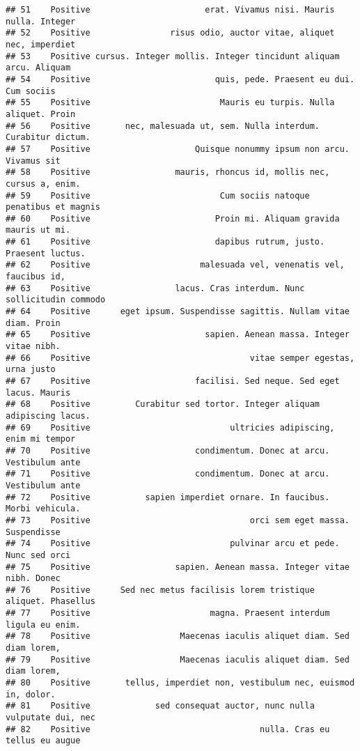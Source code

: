 \documentclass[
]{article}
\begin{document}
\begin{verbatim}
## 51    Positive                       erat. Vivamus nisi. Mauris nulla. Integer
## 52    Positive                risus odio, auctor vitae, aliquet nec, imperdiet
## 53    Positive cursus. Integer mollis. Integer tincidunt aliquam arcu. Aliquam
## 54    Positive                         quis, pede. Praesent eu dui. Cum sociis
## 55    Positive                          Mauris eu turpis. Nulla aliquet. Proin
## 56    Positive       nec, malesuada ut, sem. Nulla interdum. Curabitur dictum.
## 57    Positive                     Quisque nonummy ipsum non arcu. Vivamus sit
## 58    Positive                 mauris, rhoncus id, mollis nec, cursus a, enim.
## 59    Positive                          Cum sociis natoque penatibus et magnis
## 60    Positive                         Proin mi. Aliquam gravida mauris ut mi.
## 61    Positive                         dapibus rutrum, justo. Praesent luctus.
## 62    Positive                      malesuada vel, venenatis vel, faucibus id,
## 63    Positive                 lacus. Cras interdum. Nunc sollicitudin commodo
## 64    Positive      eget ipsum. Suspendisse sagittis. Nullam vitae diam. Proin
## 65    Positive                       sapien. Aenean massa. Integer vitae nibh.
## 66    Positive                                vitae semper egestas, urna justo
## 67    Positive                     facilisi. Sed neque. Sed eget lacus. Mauris
## 68    Positive         Curabitur sed tortor. Integer aliquam adipiscing lacus.
## 69    Positive                            ultricies adipiscing, enim mi tempor
## 70    Positive                     condimentum. Donec at arcu. Vestibulum ante
## 71    Positive                     condimentum. Donec at arcu. Vestibulum ante
## 72    Positive           sapien imperdiet ornare. In faucibus. Morbi vehicula.
## 73    Positive                                orci sem eget massa. Suspendisse
## 74    Positive                            pulvinar arcu et pede. Nunc sed orci
## 75    Positive                 sapien. Aenean massa. Integer vitae nibh. Donec
## 76    Positive      Sed nec metus facilisis lorem tristique aliquet. Phasellus
## 77    Positive                        magna. Praesent interdum ligula eu enim.
## 78    Positive                  Maecenas iaculis aliquet diam. Sed diam lorem,
## 79    Positive                  Maecenas iaculis aliquet diam. Sed diam lorem,
## 80    Positive       tellus, imperdiet non, vestibulum nec, euismod in, dolor.
## 81    Positive             sed consequat auctor, nunc nulla vulputate dui, nec
## 82    Positive                                  nulla. Cras eu tellus eu augue

\end{verbatim}
\end{document}
